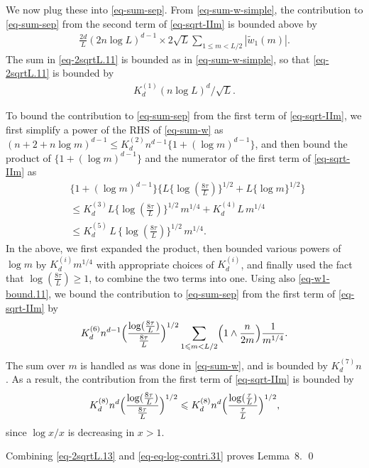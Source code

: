 \documentclass[aps,prl,superscriptaddress,reprint]{revtex4-2}
\theoremstyle{definition}
\newcommand{\abs}[1]{{\left\vert #1 \right\vert}}
\newcommand{\ti}{\tilde}
\renewcommand{\geq}{\geqslant}
\renewcommand{\le}{\leqslant}
\renewcommand{\leq}{\leqslant}
\begin{document}
We now plug
these
into \eqref{eq-sum-sep}.
From \eqref{eq-sum-w-simple},
the contribution to \eqref{eq-sum-sep} from
the second term of \eqref{eq-sqrt-IIm}
is bounded above by
\begin{align}
  \frac{2d}{L}
  (2 n \log L)^{d-1} \times 2 \sqrt{L}
    \sum_{1\le m<L/2}
    \abs{\ti w_1(m)} .
	\label{eq-2sqrtL.11}
\end{align}
The sum
in \eqref{eq-2sqrtL.11}
is bounded as in
\eqref{eq-sum-w-simple},  so that
\eqref{eq-2sqrtL.11} is bounded by
\begin{align}
	K^{(1)}_d (n \log L)^d/\sqrt{L} .
	\label{eq-2sqrtL.13}
\end{align}

To bound the contribution  to \eqref{eq-sum-sep} from the first term of \eqref{eq-sqrt-IIm},
we first simplify a power of the RHS of \eqref{eq-sum-w} as
$(n+2+n\log m)^{d-1}\le
K^{(2)}_d n^{d-1} \{1+(\log m)^{d-1} \}$,
and then
bound the product of $\{1+(\log m)^{d-1} \}$ and
the numerator of the first term of \eqref{eq-sqrt-IIm}
as
\begin{align}
	&
	\{1+(\log m)^{d-1} \}
	\bigl \{ L \{\log (\tfrac{8 \tau}{L})\}^{1/2}
	+ L \{\log m\}^{1/2} \bigr \} \,
	\nonumber \\
	&
	\leq K^{(3)}_d L \{\log (\tfrac{8 \tau}{L})\}^{1/2} \, m^{1/4}
	+ K^{(4)}_d L \, m^{1/4}
	\nonumber \\
	&
	\leq
	K^{(5)}_d \, L \,  \{\log (\tfrac{8 \tau}{L})\}^{1/2} \, m^{1/4}
	.
\end{align}
In the above, we first expanded the product, then  bounded
various powers of $\log m$ by
$K^{(i)}_d m^{1/4}$ with appropriate choices of $K^{(i)}_d$, and
finally used the fact that  $\log(\frac{8 \tau}{L}) \geq 1$,
to combine the two terms into one.
Using also \eqref{eq-w1-bound.11}, we bound
the contribution to \eqref{eq-sum-sep}
from the first term of \eqref{eq-sqrt-IIm}   by
\begin{align}
	K^{(6)}_d n^{d-1} \Bigl ( \frac{\log (\frac{8 \tau}{L})}{\frac{8 \tau}{L}}
  	\Bigr )^{1/2}
	\sum_{1\le m<L/2}
	\Bigl ( 1 \wedge \frac{n}{2m} \Bigr ) \frac{1}{m^{1/4}}
	.
	\label{eq-log-contri.11}
\end{align}
The sum over $m$ is handled as was done in \eqref{eq-sum-w},
and is bounded by $K^{(7)}_d n$.  As a result,
the contribution from the first term of \eqref{eq-sqrt-IIm}
is bounded by
\begin{equation}
  K^{(8)}_d n^{d} \Bigl ( \frac{\log (\frac{8 \tau}{L})}{\frac{8 \tau}{L}}
  \Bigr )^{1/2}
  \le
  K^{(8)}_d n^{d} \Bigl ( \frac{\log (\frac{\tau}{L})}{\frac{\tau}{L}}
  \Bigr )^{1/2} ,
  \label{eq-eq-log-contri.31}
\end{equation}
since $\log x/x$ is decreasing in $x>1$.

Combining \eqref{eq-2sqrtL.13} and  \eqref{eq-eq-log-contri.31}
proves
Lemma~8.
\qed
\end{document}
